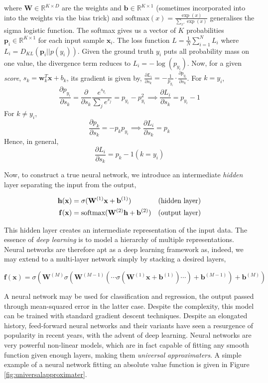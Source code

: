 \documentclass[11pt]{amsart}
\begin{document}
where $\mathbf{W} \in \mathbb{R}^{K \times D}$ are the weights and $\mathbf{b} \in \mathbb{R}^{K \times 1}$ (sometimes incorporated into into the weights via the bias trick) and $\text{softmax}(x) = \frac{\exp(x)}{\sum_{x'}\exp(x)}$ generalises the sigma logistic function. The softmax gives us a vector of $K$ probabilities $\mathbf{p}_i \in \mathbb{R}^{K \times 1}$ for each input sample $\mathbf{x}_i$. The loss function $L = \frac{1}{N}\sum_{i=1}^N L_i$ where $L_i = D_{KL}(\mathbf{p}_i || p(y_i))$. Given the ground truth $y_i$ puts all probability mass on one value, the divergence term reduces to $L_i = -\log(p_{y_i})$. Now, for a given \emph{score}, $s_k = \mathbf{w}_k^T\mathbf{x} + b_k$, its gradient is given by, $\frac{\partial L_i}{\partial s_k} = -\frac{1}{p_{y_i}}\cdot\frac{\partial p_{y_i}}{\partial s_k}$. For $k = y_{i}$, $$\frac{\partial p_{y_i}}{\partial s_k}
= \frac{\partial}{\partial s_k}\frac{e^{s_{y_i}}}{\sum_j e^{s_j}}
= p_{y_i} - p_{y_i}^2 \implies \frac{\partial L_i}{\partial s_k}
= p_{y_i} - 1$$
For $k \neq y_{i}$, $$\frac{\partial p_{k}}{\partial s_k}
= -p_kp_{y_i} \implies \frac{\partial L_i}{\partial s_k} = p_k$$
Hence, in general, $$\frac{\partial L_i}{\partial s_k}
= p_k - 1(k = y_i)$$

Now, to construct a true neural network, we introduce an intermediate \emph{hidden} layer separating the input from the output,

\begin{align}
\mathbf{h}(\mathbf{x}) &= \sigma(\mathbf{W}^{(1)}\mathbf{x}  + \mathbf{b}^{(1)}) & \text{(hidden layer)} \notag \\
\mathbf{f}(\mathbf{x}) &= \text{softmax}(\mathbf{W}^{(2)}\mathbf{h} + \mathbf{b}^{(2)}) & \text{(output layer)}\notag
\end{align}

This hidden layer creates an intermediate representation of the input data. The essence of \emph{deep learning} is to model a hierarchy of multiple representations. Neural networks are therefore apt as a deep learning framework as, indeed, we may extend to a multi-layer network simply by stacking a desired layers,

$$\mathbf{f}(\mathbf{x}) = \sigma(\mathbf{W}^{(M)}\sigma(\mathbf{W}^{(M-1)}(\cdots\sigma(\mathbf{W}^{(1)}\mathbf{x} + \mathbf{b}^{(1)})\cdots)  + \mathbf{b}^{(M-1)})  + \mathbf{b}^{(M)})$$

A neural network may be used for classification and regression, the output passed through mean-squared error in the latter case. Despite the complexity, this model can be trained with standard gradient descent techniques. Despite an elongated history, feed-forward neural networks and their variants have seen a resurgence of popularity in recent years, with the advent of deep learning. Neural networks are very powerful non-linear models, which are in fact capable of fitting any smooth function given enough layers, making them \emph{universal approximaters}. A simple example of a neural network fitting an absolute value function is given in Figure \ref{fig:universalapproximater}.
\end{document}
